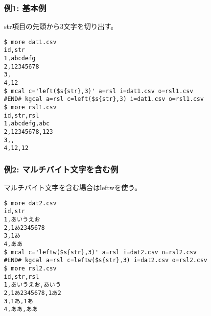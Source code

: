\subsubsection*{例1: 基本例}

str項目の先頭から3文字を切り出す。


\begin{Verbatim}[baselinestretch=0.7,frame=single]
$ more dat1.csv
id,str
1,abcdefg
2,12345678
3,
4,12
$ mcal c='left($s{str},3)' a=rsl i=dat1.csv o=rsl1.csv
#END# kgcal a=rsl c=left($s{str},3) i=dat1.csv o=rsl1.csv
$ more rsl1.csv
id,str,rsl
1,abcdefg,abc
2,12345678,123
3,,
4,12,12
\end{Verbatim}
\subsubsection*{例2: マルチバイト文字を含む例}

マルチバイト文字を含む場合はleftwを使う。


\begin{Verbatim}[baselinestretch=0.7,frame=single]
$ more dat2.csv
id,str
1,あいうえお
2,1あ2345678
3,1あ
4,ああ
$ mcal c='leftw($s{str},3)' a=rsl i=dat2.csv o=rsl2.csv
#END# kgcal a=rsl c=leftw($s{str},3) i=dat2.csv o=rsl2.csv
$ more rsl2.csv
id,str,rsl
1,あいうえお,あいう
2,1あ2345678,1あ2
3,1あ,1あ
4,ああ,ああ
\end{Verbatim}
